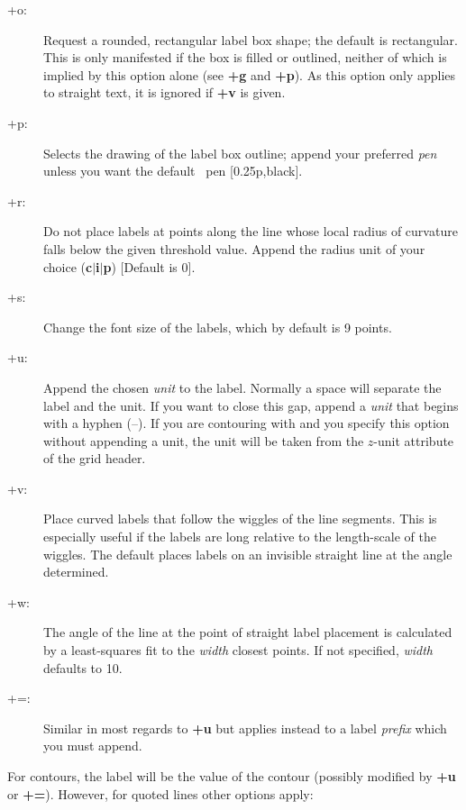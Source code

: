 \begin{description}
\item [+o:] Request a rounded, rectangular label box shape; the default is rectangular.  This is only
manifested if the box is filled or outlined, neither of which is implied by this option alone (see \textbf{+g}
and \textbf{+p}).  As this option only applies to straight text, it is ignored if \textbf{+v} is given.
\item [+p:] Selects the drawing of the label box outline; append your preferred \emph{pen} unless you
want the default \GMT\ pen [0.25p,black].
\item [+r:] Do not place labels at points along the line whose local radius of curvature falls below
the given threshold value.  Append the radius unit of your choice (\textbf{c$|$i$|$p}) [Default is 0].
\item [+s:] Change the font size of the labels, which by default is 9 points.
\item [+u:] Append the chosen \emph{unit} to the label.  Normally a space will separate the label
and the unit.  If you want to close this gap, append a \emph{unit} that begins with a hyphen (--).
If you are contouring with  and you specify this option without appending a unit, the unit will be taken from the
$z$-unit attribute of the grid header.
\item [+v:]  Place curved labels that follow the wiggles of the line segments.  This is especially
useful if the labels are long relative to the length-scale of the wiggles.  The default places labels
on an invisible straight line at the angle determined.
\item [+w:] The angle of the line at the point of straight label placement is calculated by a least-squares
fit to the \emph{width} closest points.  If not specified, \emph{width} defaults to 10.
\item [+=:]  Similar in most regards to \textbf{+u} but applies instead to a label \emph{prefix} which
you must append.
\end{description}
For contours, the label will be the value of the contour (possibly modified by \textbf{+u} or \textbf{+=}).
However, for quoted lines other options apply:
